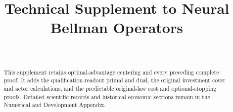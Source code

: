 \documentclass[ecta,nameyear,draft]{econsocart}
\begin{document}
\begin{frontmatter}
\title{Technical Supplement to Neural Bellman Operators}
\begin{aug}
\author[id=au1,addressref={add1}]{~}
\address[id=add1]{Peking University}
\end{aug}
\begin{abstract}
This supplement retains optimal-advantage centering and every preceding complete proof. It adds the qualification-readout primal and dual, the original investment cover and actor calculations, and the predictable original-law cost and optional-stopping proofs. Detailed scientific records and historical economic sections remain in the Numerical and Development Appendix.
\end{abstract}
\end{frontmatter}







\end{document}
